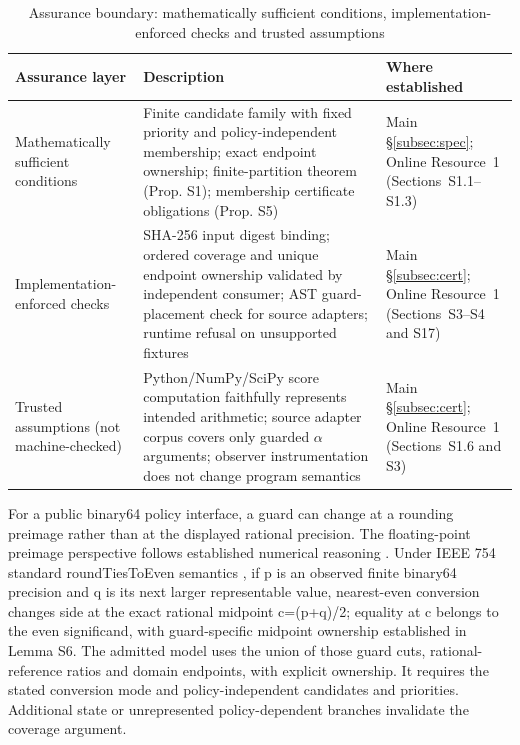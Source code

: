 \documentclass[11pt,a4paper]{article}
\begin{document}
\begin{table}[!htbp]
\caption{Assurance boundary: mathematically sufficient conditions, implementation-enforced checks and trusted assumptions}\label{tab:2}
\centering
\footnotesize
\setlength{\tabcolsep}{3.5pt}
\renewcommand{\arraystretch}{1.15}
\begin{tabularx}{\textwidth}{@{} >{\raggedright\arraybackslash}p{2.8cm} >{\raggedright\arraybackslash}X >{\raggedright\arraybackslash}p{3.2cm} @{}}
\toprule
\textbf{Assurance layer} & \textbf{Description} & \textbf{Where established} \\
\midrule
Mathematically sufficient conditions & Finite candidate family with fixed priority and policy-independent membership; exact endpoint ownership; finite-partition theorem (Prop. S1); membership certificate obligations (Prop. S5) & Main \S\ref{subsec:spec}; Online Resource~1 (Sections~S1.1--S1.3) \\
\midrule
Implementation-enforced checks & SHA-256 input digest binding; ordered coverage and unique endpoint ownership validated by independent consumer; AST guard-placement check for source adapters; runtime refusal on unsupported fixtures & Main \S\ref{subsec:cert}; Online Resource~1 (Sections~S3--S4 and S17) \\
\midrule
Trusted assumptions (not machine-checked) & Python/NumPy/SciPy score computation faithfully represents intended arithmetic; source adapter corpus covers only guarded $\alpha$ arguments; observer instrumentation does not change program semantics & Main \S\ref{subsec:cert}; Online Resource~1 (Sections~S1.6 and S3) \\
\bottomrule
\end{tabularx}
\end{table}
\FloatBarrier

For a public binary64 policy interface, a guard can change at a rounding preimage rather than at the displayed rational precision. The floating-point preimage perspective follows established numerical reasoning \cite{andrlon2023finding}. Under IEEE 754 standard roundTiesToEven semantics \cite{ieee2019floating}, if p is an observed finite binary64 precision and q is its next larger representable value, nearest-even conversion changes side at the exact rational midpoint c=(p+q)/2; equality at c belongs to the even significand, with guard-specific midpoint ownership established in Lemma S6. The admitted model uses the union of those guard cuts, rational-reference ratios and domain endpoints, with explicit ownership. It requires the stated conversion mode and policy-independent candidates and priorities. Additional state or unrepresented policy-dependent branches invalidate the coverage argument.
\end{document}
